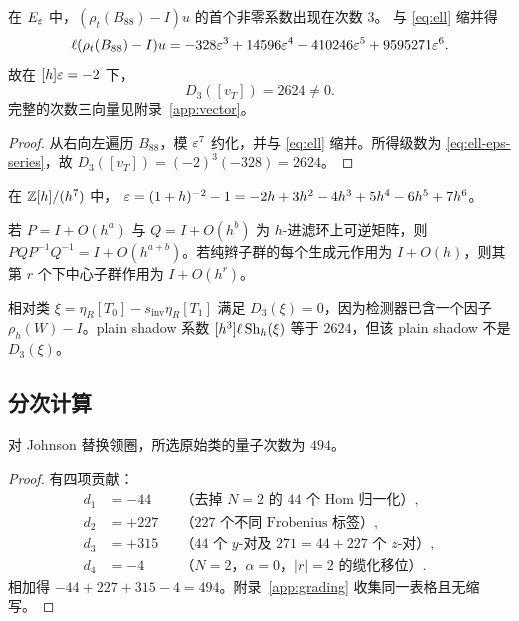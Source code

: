 \begin{proposition}[所选值]\label{prop:D3-vT}
在 $E_\varepsilon$ 中，$(\rho_t(B_{88})-I)u$ 的首个非零系数出现在次数 $3$。
与 \eqref{eq:ell} 缩并得
\begin{equation}\label{eq:ell-eps-series}
\ell(\rho_t(B_{88})-I)u
=-328\varepsilon^3+14596\varepsilon^4-410246\varepsilon^5+9595271\varepsilon^6.
\end{equation}
故在 $[h]\varepsilon=-2$ 下，
\begin{equation}\label{eq:D3-vT-value}
D_3([v_T])=2624\ne0.
\end{equation}
完整的次数三向量见附录~\ref{app:vector}。
\end{proposition}

\begin{proof}
从右向左遍历 $B_{88}$，模 $\varepsilon^7$ 约化，并与 \eqref{eq:ell} 缩并。所得级数为
\eqref{eq:ell-eps-series}，故 $D_3([v_T])=(-2)^3(-328)=2624$。
\end{proof}

\begin{lemma}[参数展开]\label{lem:eps-of-h}
在 $\mathbb{Z}[h]/(h^7)$ 中，
$\varepsilon=(1+h)^{-2}-1=-2h+3h^2-4h^3+5h^4-6h^5+7h^6$。
\end{lemma}

\begin{lemma}[交换子阶]\label{lem:commutator-order}
若 $P=I+O(h^a)$ 与 $Q=I+O(h^b)$ 为 $h$-进滤环上可逆矩阵，则
$PQP^{-1}Q^{-1}=I+O(h^{a+b})$。若纯辫子群的每个生成元作用为 $I+O(h)$，则其第
$r$ 个下中心子群作用为 $I+O(h^r)$。
\end{lemma}

\begin{remark}[相对类]\label{rem:vT-xi}
相对类 $\xi=\eta_R[T_0]-s_{\mathrm{inv}}\eta_R[T_1]$ 满足 $D_3(\xi)=0$，因为检测器已含一个因子
$\rho_h(W)-I$。plain shadow 系数 $[h^3]\ell\operatorname{Sh}_h(\xi)$ 等于 $2624$，但该 plain shadow
不是 $D_3(\xi)$。
\end{remark}

\subsection{分次计算}

\begin{proposition}[量子次数]\label{prop:degree-494}
对 Johnson 替换领圈，所选原始类的量子次数为 $494$。
\end{proposition}

\begin{proof}
有四项贡献：
\begin{align}
d_1&=-44 &&\text{（去掉 $N=2$ 的 $44$ 个 Hom 归一化）},\\
d_2&=+227 &&\text{（$227$ 个不同 Frobenius 标签）},\\
d_3&=+315 &&\text{（$44$ 个 $y$-对及 $271=44+227$ 个 $z$-对）},\\
d_4&=-4 &&\text{（$N=2$，$\alpha=0$，$|r|=2$ 的缆化移位）}.
\end{align}
相加得 $-44+227+315-4=494$。附录~\ref{app:grading} 收集同一表格且无缩写。
\end{proof}

